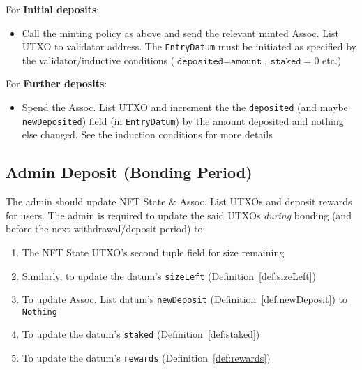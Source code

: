 \documentclass[10pt, a4paper]{article}
\theoremstyle{definition}
\begin{document}
For \textbf{Initial deposits}:
\begin{itemize}
\item{Call the minting policy as above and send the relevant minted Assoc. List UTXO to validator address. The \texttt{EntryDatum} must be initiated as specified by the validator/inductive conditions ($\texttt{deposited} = \texttt{amount}$, $\texttt{staked} = 0$ etc.)}
\end{itemize}
For \textbf{Further deposits}:
\begin{itemize}
\item{Spend the Assoc. List UTXO and increment the the \texttt{deposited} (and maybe \texttt{newDeposited}) field (in \texttt{EntryDatum}) by the amount deposited and nothing else changed. See the induction conditions for more details}
\end{itemize}

\subsection{Admin Deposit (Bonding Period)}\label{subsection:adminDeposit}
The admin should update NFT State \& Assoc. List UTXOs and deposit rewards for users.  The admin is required to update the said UTXOs \textit{during} bonding (and before the next withdrawal/deposit period) to:
\begin{enumerate}
\item{The NFT State UTXO's second tuple field for size remaining}
\item{Similarly, to update the datum's \texttt{sizeLeft} (Definition~\ref{def:sizeLeft})}
\item{To update Assoc. List datum's \texttt{newDeposit} (Definition~\ref{def:newDeposit}) to \texttt{Nothing}}
\item{To update the datum's \texttt{staked} (Definition~\ref{def:staked})}
\item{To update the datum's \texttt{rewards} (Definition~\ref{def:rewards})}
\end{enumerate}
\end{document}
